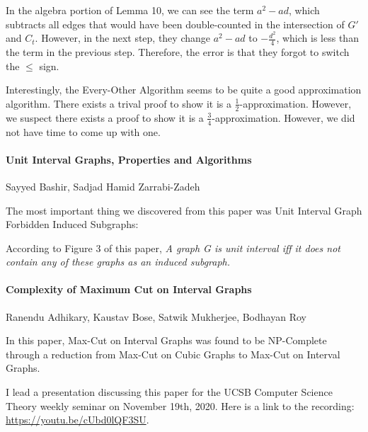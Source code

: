 \documentclass[12pt]{article}
\begin{document}
In the algebra portion of Lemma 10, we can see the term $a^2 - ad$, which subtracts all edges that would have been double-counted in the intersection of $G'$ and $C_t$. However, in the next step, they change $a^2 - ad$ to $-\frac{d^2}{4}$, which is less than the term in the previous step. Therefore, the error is that they forgot to switch the $\leq$ sign.

Interestingly, the Every-Other Algorithm seems to be quite a good approximation algorithm. There exists a trival proof to show it is a $\frac{1}{2}$-approximation. However, we suspect there exists a proof to show it is a $\frac{3}{4}$-approximation. However, we did not have time to come up with one.



\pagebreak


\paragraph{Unit Interval Graphs, Properties and Algorithms} Sayyed Bashir, Sadjad Hamid Zarrabi-Zadeh

The most important thing we discovered from this paper was Unit Interval Graph Forbidden Induced Subgraphs:
\begin{center}
\end{center}

According to Figure 3 of this paper, \emph{A graph G is unit interval iff it does not contain any of these graphs as an induced
subgraph.}


\paragraph{Complexity of Maximum Cut on Interval Graphs} Ranendu Adhikary, Kaustav Bose, Satwik Mukherjee, Bodhayan Roy

In this paper, Max-Cut on Interval Graphs was found to be NP-Complete through a reduction from Max-Cut on Cubic Graphs to Max-Cut on Interval Graphs.

I lead a presentation discussing this paper for the UCSB Computer Science Theory weekly seminar on November 19th, 2020. Here is a link to the recording: \url{https://youtu.be/cUbd0lQF3SU}.
\end{document}
